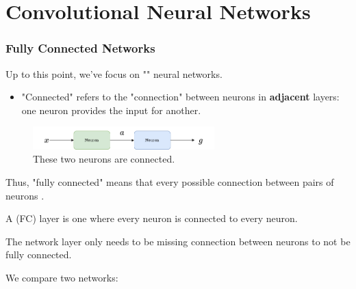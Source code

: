 
\setcounter{chapter}{7-1}

\chapter{Convolutional Neural Networks}

    \subsection{Fully Connected Networks}

        Up to this point, we've focus on "" neural networks. 

        \begin{itemize}
            \item "Connected" refers to the "connection" between neurons in \textbf{adjacent} layers: one neuron provides the input for another.
        \end{itemize}

        \begin{figure}[H]
            \centering
            \includegraphics[width=70mm,scale=0.5]{images/nn_images/series_a.png}
            
            \caption*{These two neurons are connected.}
        \end{figure}

        Thus, "fully connected" means that every possible connection between pairs of neurons .\\
        
        \begin{definition}
            A  (FC) layer is one where every  neuron is connected to every  neuron.

            The network layer only needs to be missing  connection between neurons to not be fully connected.
        \end{definition}

        \miniex We compare two networks:

